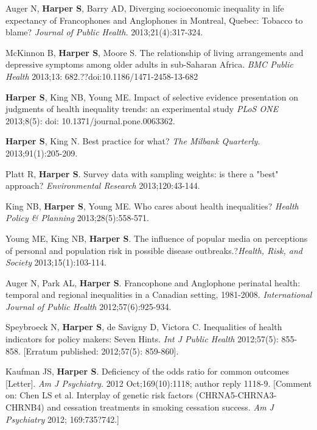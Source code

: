 \documentclass[
  letterpaper,
  DIV=11,
  numbers=noendperiod]{scrartcl}
\begin{document}
\begin{etaremune}
\item Auger N, \textbf{Harper S}, Barry AD, Diverging socioeconomic inequality in life expectancy of Francophones and Anglophones in Montreal, Quebec: Tobacco to blame? \emph{Journal of Public Health.} 2013;21(4):317-324.
 
\item *McKinnon B, \textbf{Harper S}, Moore S. The relationship of living arrangements and depressive symptoms among older adults in sub-Saharan Africa. \emph{BMC Public Health} 2013;13: 682.??doi:10.1186/1471-2458-13-682
 
\item \textbf{Harper S}, King NB, Young ME. Impact of selective evidence presentation on judgments of health inequality trends: an experimental study \emph{PLoS ONE} 2013;8(5): doi: 10.1371/journal.pone.0063362.

\item \textbf{Harper S}, King N. Best practice for what? \emph{The Milbank Quarterly.} 2013;91(1):205-209.
 
\item Platt R, \textbf{Harper S}. Survey data with sampling weights: is there a "best" approach? \emph{Environmental Research} 2013;120:43-144.
 
\item King NB, \textbf{Harper S}, Young ME. Who cares about health inequalities? \emph{Health Policy \& Planning} 2013;28(5):558-571.
 
\item Young ME, King NB, \textbf{Harper S}. The influence of popular media on perceptions of personal and population risk in possible disease outbreaks.?\emph{Health, Risk, and Society} 2013;15(1):103-114.
 
\item Auger N, Park AL, \textbf{Harper S}. Francophone and Anglophone perinatal health: temporal and regional inequalities in a Canadian setting, 1981-2008. \emph{International Journal of Public Health} 2012;57(6):925-934.
 
\item Speybroeck N, \textbf{Harper S}, de Savigny D, Victora C. Inequalities of health indicators for policy makers: Seven Hints. \emph{Int J Public Health} 2012;57(5): 855-858. [Erratum published: 2012;57(5): 859-860].
 
\item Kaufman JS, \textbf{Harper S}. Deficiency of the odds ratio for common outcomes [Letter]. \emph{Am J Psychiatry.} 2012 Oct;169(10):1118; author reply 1118-9. [Comment on: Chen  LS et al. Interplay of genetic risk factors (CHRNA5-CHRNA3-CHRNB4) and cessation treatments in smoking cessation success.  \emph{Am J Psychiatry} 2012; 169:735?742.]
 

\end{etaremune}
\end{document}
